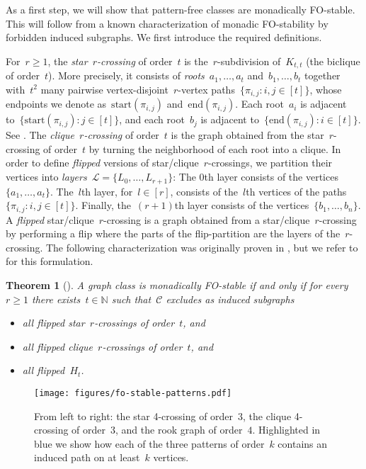 \documentclass[11pt]{article}      \usepackage[margin=1in]{geometry}  \usepackage{microtype}
\newtheorem{theorem}{Theorem}[section]
\theoremstyle{definition}
\newcommand{\N}[0]{\mathrm{\mathbb{N}}}
\newcommand{\Start}{\mathrm{start}}
\newcommand{\End}{\mathrm{end}}
\newcommand{\LL}{\mathcal{L}}
\newcommand{\CC}{\mathcal{C}}
\renewcommand{\ge}{\geqslant}
\renewcommand{\geq}{\ge}
\begin{document}
As a first step, we will show that pattern-free classes are monadically FO-stable.
This will follow from a known characterization of monadic FO-stability by forbidden induced subgraphs.
We first introduce the required definitions.

For~$r \ge 1$, the \emph{star~$r$-crossing} of order~$t$ is the~$r$-subdivision of~$K_{t,t}$ (the biclique of order~$t$).
More precisely, it consists of \emph{roots}~$a_1,\dots,a_t$ and~$b_1,\dots,b_t$
together with~$t^2$ many pairwise vertex-disjoint~$r$-vertex paths~$\{ \pi_{i,j} : i,j \in [t] \}$, whose endpoints we denote as~$\Start(\pi_{i,j})$ and~$\End(\pi_{i,j})$.
Each root~$a_i$ is adjacent to~$\{ \Start(\pi_{i,j}) : j \in [t] \}$,
and each root~$b_j$ is adjacent to~$\{ \End(\pi_{i,j}) : i \in [t] \}$.
See .
The \emph{clique~$r$-crossing} of order~$t$ is the graph obtained from the star~$r$-crossing of order~$t$
by turning the neighborhood of each root into a clique.
In order to define \emph{flipped} versions of star/clique~$r$-crossings, we partition their vertices into \emph{layers}~$\LL = \{L_0, \ldots, L_{r+1}\}$:
The 0th layer consists of the vertices~$\{a_1,\dots,a_t\}$.
The~$l$th layer, for~$l \in [r]$, consists of the~$l$th vertices of the paths~$\{ \pi_{i,j} : i,j \in [t] \}$.
Finally, the~$(r+1)$th layer consists of the vertices~$\{b_1,\dots,b_n\}$. 
A \emph{flipped} star/clique~$r$-crossing
is a graph obtained from a 
star/clique~$r$-crossing
by performing a flip where the parts of the flip-partition are the layers of the~$r$-crossing.
The following characterization was originally proven in \cite{dreier2024stablemc}, but we refer to \cite{maehlmann-thesis} for this formulation.

\begin{theorem}[{\cite{dreier2024stablemc}}]\label{lem:fo-patterns}
  A graph class is monadically FO-stable if and only if
  for every~$r \geq 1$ there exists~$t \in \N$
        such that~$\CC$ excludes as induced subgraphs
        \begin{itemize}
            \item all flipped star~$r$-crossings of order~$t$, and
            \item all flipped clique~$r$-crossings of order~$t$, and
\item all flipped~$H_t$.
        \end{itemize}
\end{theorem}

\begin{figure}[htbp]
  \centering
  \texttt{[image: figures/fo-stable-patterns.pdf]}
  \caption{From left to right: the star 4-crossing of order~$3$,
  the clique 4-crossing of order~$3$, and the rook graph of order~$4$.
  Highlighted in blue we show how each of the three patterns of order~$k$ contains an induced path on at least~$k$ vertices.
  }
  \label{fig:fo-patterns}
\end{figure}
\end{document}
